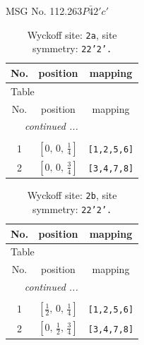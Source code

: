 \documentclass[fleqn,8pt]{jsarticle}
\begin{document}
\setcounter{MaxMatrixCols}{32}

\renewcommand{\tablename}{Table~}
\renewcommand{\figurename}{Figure~}
\begin{center}
\LARGE
MSG No. 112.263\quad$P\bar{4}2'c'$
\end{center}
\renewcommand{\arraystretch}{1.2}
\begin{longtable}{ccc}
\caption{Wyckoff site: {\tt 2a}, site symmetry: {\tt 22'2'.}}
 \\
 \hline \hline
No. & position & mapping \\ \hline \endfirsthead

\multicolumn{2}{l}{\tablename\ \thetable{}} \\
 \hline \hline
No. & position & mapping \\ \hline \endhead

 \hline \hline
\multicolumn{2}{r}{\footnotesize\it continued ...} \\ \endfoot

 \hline \hline
\multicolumn{2}{r}{} \\ \endlastfoot

1 & $\left[ 0,\, 0,\, \frac{1}{4} \right]$ & {\tt [1,2,5,6]} \\ \hline
2 & $\left[ 0,\, 0,\, \frac{3}{4} \right]$ & {\tt [3,4,7,8]} \\
\end{longtable}
\renewcommand{\arraystretch}{1.2}
\begin{longtable}{ccc}
\caption{Wyckoff site: {\tt 2b}, site symmetry: {\tt 22'2'.}}
 \\
 \hline \hline
No. & position & mapping \\ \hline \endfirsthead

\multicolumn{2}{l}{\tablename\ \thetable{}} \\
 \hline \hline
No. & position & mapping \\ \hline \endhead

 \hline \hline
\multicolumn{2}{r}{\footnotesize\it continued ...} \\ \endfoot

 \hline \hline
\multicolumn{2}{r}{} \\ \endlastfoot

1 & $\left[ \frac{1}{2},\, 0,\, \frac{1}{4} \right]$ & {\tt [1,2,5,6]} \\ \hline
2 & $\left[ 0,\, \frac{1}{2},\, \frac{3}{4} \right]$ & {\tt [3,4,7,8]} \\
\end{longtable}
\end{document}
